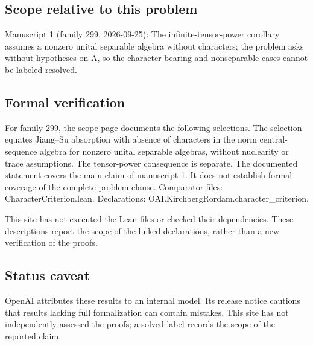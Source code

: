 \documentclass[11pt]{article}
\begin{document}
\subsection{Scope relative to this problem}
Manuscript 1 (family 299, 2026-09-25): The infinite-tensor-power corollary assumes a nonzero unital separable algebra without characters; the problem asks without hypotheses on A, so the character-bearing and nonseparable cases cannot be labeled resolved.

\subsection{Formal verification}
For family 299, the scope page documents the following selections. The selection equates Jiang--Su absorption with absence of characters in the norm central-sequence algebra for nonzero unital separable algebras, without nuclearity or trace assumptions. The tensor-power consequence is separate. The documented statement covers the main claim of manuscript 1. It does not establish formal coverage of the complete problem clause. Comparator files: CharacterCriterion.lean. Declarations: OAI.KirchbergRordam.character\_criterion.

This site has not executed the Lean files or checked their dependencies. These descriptions report the scope of the linked declarations, rather than a new verification of the proofs.

\subsection{Status caveat}
OpenAI attributes these results to an internal model. Its release notice cautions that results lacking full formalization can contain mistakes. This site has not independently assessed the proofs; a solved label records the scope of the reported claim.
\end{document}
